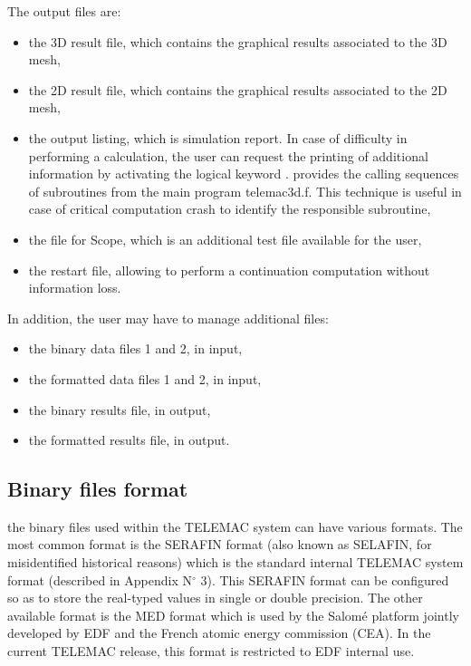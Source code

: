 The output files are:

\begin{itemize}
\item the 3D result file, which contains the graphical results associated to
the 3D mesh,

\item the 2D result file, which contains the graphical results associated to
the 2D mesh,

\item the output listing, which is simulation report. In case of difficulty in
performing a calculation, the user can request the printing of additional
information by activating the logical keyword .
 provides the calling sequences of subroutines from the
main program telemac3d.f. This technique is useful in case of critical
computation crash to identify the responsible subroutine,

\item the file for Scope, which is an additional test file available for the
user,

\item the restart file, allowing to perform a continuation computation without
information loss.
\end{itemize}

In addition, the user may have to manage additional files:

\begin{itemize}
\item the binary data files 1 and 2, in input,

\item the formatted data files 1 and 2, in input,

\item the binary results file, in output,

\item the formatted results file, in output.
\end{itemize}


\subsection{Binary files format}
\label{sec:binfile}
the binary files used within the TELEMAC system can have various formats. The
most common format is the SERAFIN format (also known as SELAFIN, for
misidentified historical reasons) which is the standard internal TELEMAC system
format (described in Appendix N${}^\circ$ 3). This SERAFIN format can be
configured so as to store the real-typed values in single or double precision.
The other available format is the MED format which is used by the Salomé
platform jointly developed by EDF and the French atomic energy commission
(CEA). In the current TELEMAC release, this format is restricted to EDF
internal use.

